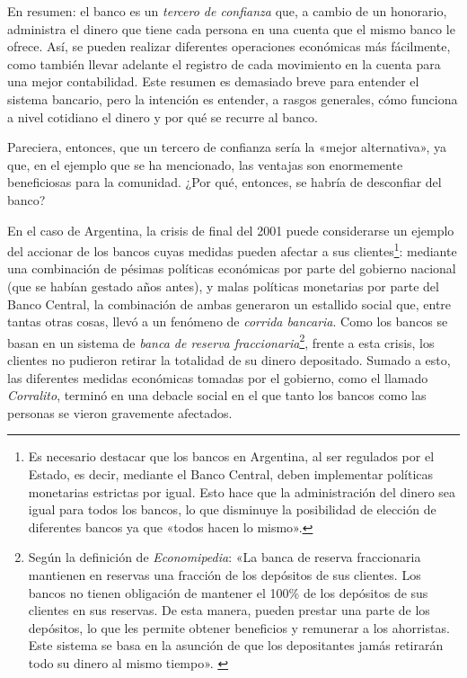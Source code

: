 \documentclass[12pt,a4paper,twoside]{book}
\begin{document}
En resumen: el banco es un \textit{tercero de confianza} que, a cambio de un honorario, administra el dinero que tiene cada persona en una cuenta que el mismo banco le ofrece. Así, se pueden realizar diferentes operaciones económicas más fácilmente, como también llevar adelante el registro de cada movimiento en la cuenta para una mejor contabilidad. Este resumen es demasiado breve para entender el sistema bancario, pero la intención es entender, a rasgos generales, cómo funciona a nivel cotidiano el dinero y por qué se recurre al banco.

Pareciera, entonces, que un tercero de confianza sería la «mejor alternativa», ya que, en el ejemplo que se ha mencionado, las ventajas son enormemente beneficiosas para la comunidad. ¿Por qué, entonces, se habría de desconfiar del banco?

En el caso de Argentina, la crisis de final del 2001 puede considerarse un ejemplo del accionar de los bancos cuyas medidas pueden afectar a sus clientes\footnote{Es necesario destacar que los bancos en Argentina, al ser regulados por el Estado, es decir, mediante el Banco Central, deben implementar políticas monetarias estrictas por igual. Esto hace que la administración del dinero sea igual para todos los bancos, lo que disminuye la posibilidad de elección de diferentes bancos ya que «todos hacen lo mismo».}: mediante una combinación de pésimas políticas económicas por parte del gobierno nacional (que se habían gestado años antes), y malas políticas monetarias por parte del Banco Central, la combinación de ambas generaron un estallido social que, entre tantas otras cosas, llevó a un fenómeno de \textit{corrida bancaria}. Como los bancos se basan en un sistema de \textit{banca de reserva fraccionaria}\footnote{Según la definición de \textit{Economipedia}: «La banca de reserva fraccionaria mantienen en reservas una fracción de los depósitos de sus clientes. Los bancos no tienen obligación de mantener el 100\% de los depósitos de sus clientes en sus reservas. De esta manera, pueden prestar una parte de los depósitos, lo que les permite obtener beneficios y remunerar a los ahorristas. Este sistema se basa en la asunción de que los depositantes jamás retirarán todo su dinero al mismo tiempo». \cite{epedia:encajefrac}}, frente a esta crisis, los clientes no pudieron retirar la totalidad de su dinero depositado. Sumado a esto, las diferentes medidas económicas tomadas por el gobierno, como el llamado \textit{Corralito}, terminó en una debacle social en el que tanto los bancos como las personas se vieron gravemente afectados.
\end{document}
